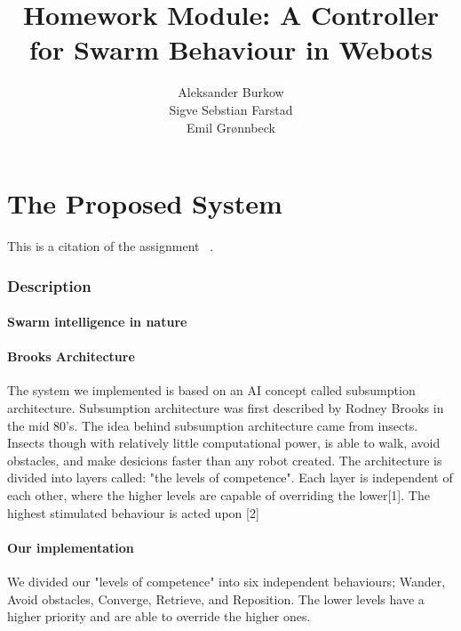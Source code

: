 \documentclass{article}
\title{Homework Module: A Controller for Swarm Behaviour in Webots}
\author{
    Aleksander Burkow \\
    Sigve Sebstian Farstad \\
    Emil Grønnbeck
}
\begin{document}
\maketitle
\thispagestyle{empty}


\newpage

\setcounter{page}{1}

\part{The Proposed System}

This is a citation of the assignment ~\cite{assignment}.

\section{Description}


\subsection{Swarm intelligence in nature}



\subsection{Brooks Architecture}
The system we implemented is based on an AI concept called subsumption architecture. Subsumption architecture was first described by Rodney Brooks in the mid 80's. The idea behind subsumption architecture came from insects. Insects though with relatively little computational power, is able to walk, avoid obstacles, and make desicions faster than any robot created. The architecture is divided into layers called: "the levels of competence". Each layer is  independent of each other, where the higher levels are capable of overriding the lower[1]. The highest stimulated behaviour is acted upon [2]

\subsection{Our implementation}
We divided our "levels of competence" into six independent behaviours; Wander, Avoid obstacles, Converge, Retrieve, and Reposition. The lower levels have a higher priority and are able to override the higher ones.

\end{document}
